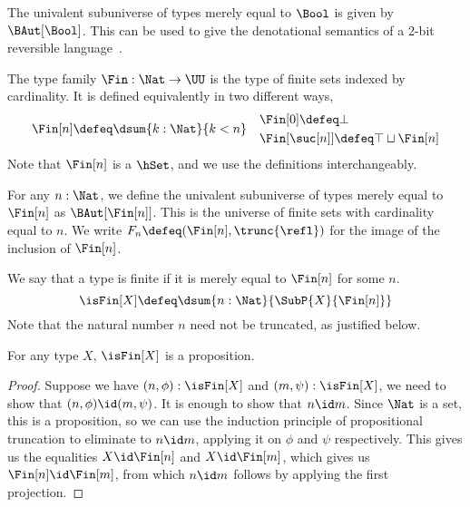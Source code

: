 \begin{example}
  The univalent subuniverse of types merely equal to $\Bool$ is given by $\BAut[\Bool]$. This can be used to give the
  denotational semantics of a 2-bit reversible language~\cite{caretteReversibleProgramsUnivalent2018}.
\end{example}

\begin{definition}[$\Fin$]
  The type family $\Fin : \Nat \to \UU$ is the type of finite sets indexed by cardinality. It is defined equivalently in
  two different ways,
  \begin{gather*}
    \begin{aligned}
      \Fin[n] & \defeq \dsum{k:\Nat}{k < n}
    \end{aligned}
    \begin{aligned}
      & \Fin[0] \defeq \bot \\
      & \Fin[\suc[n]] \defeq \top \sqcup \Fin[n]
    \end{aligned}
  \end{gather*}
  Note that $\Fin[n]$ is a $\hSet$, and we use the definitions interchangeably.
\end{definition}

\begin{example}
  For any $n : \Nat$, we define the univalent subuniverse of types merely equal to $\Fin[n]$ as $\BAut[\Fin[n]]$. This
  is the universe of finite sets with cardinality equal to $n$. We write $F_{n} \defeq (\Fin[n], \trunc{\refl})$ for the
  image of the inclusion of $\Fin[n]$.
\end{example}

\begin{definition}[$\isFin$]
  We say that a type is finite if it is merely equal to $\Fin[n]$ for some $n$.
  \[
    \isFin[X] \defeq \dsum{n:\Nat}{\SubP{X}{\Fin[n]}}
  \]
  Note that the natural number $n$ need not be truncated, as justified below.
\end{definition}

\begin{proposition}
  For any type $X$, $\isFin[X]$ is a proposition.
\end{proposition}

\begin{proof}
  Suppose we have $(n,\phi) : \isFin[X]$ and $(m,\psi) : \isFin[X]$, we need to show that $(n,\phi) \id (m,\psi)$. It is
  enough to show that $n \id m$. Since $\Nat$ is a set, this is a proposition, so we can use the induction principle of
  propositional truncation to eliminate to $n \id m$, applying it on $\phi$ and $\psi$ respectively. This gives us the
  equalities $X \id \Fin[n]$ and $X \id \Fin[m]$, which gives us $\Fin[n] \id \Fin[m]$, from which $n \id m$ follows by
  applying the first projection.
\end{proof}

